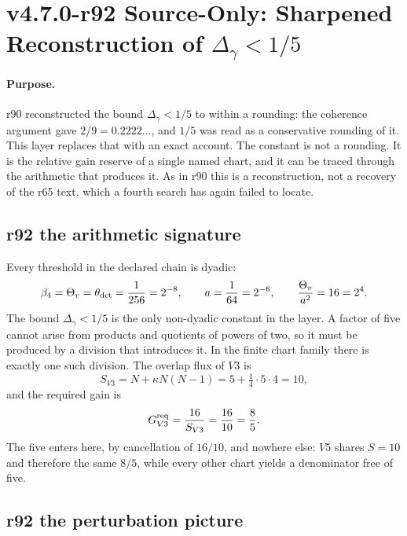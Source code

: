 \clearpage
\section*{v4.7.0-r92 Source-Only: Sharpened Reconstruction of \texorpdfstring{\(\Delta_\gamma<1/5\)}{Delta gamma < 1/5}}
\label{sec:r92-delta-gamma-sharpened}

\paragraph{Purpose.}
r90 reconstructed the bound \(\Delta_\gamma<1/5\) to within a rounding: the coherence
argument gave \(2/9=0.2222\ldots\), and \(1/5\) was read as a conservative rounding of it.
This layer replaces that with an exact account.  The constant is not a rounding.  It is the
relative gain reserve of a single named chart, and it can be traced through the arithmetic
that produces it.  As in r90 this is a reconstruction, not a recovery of the r65 text, which
a fourth search has again failed to locate.

\subsection*{r92 the arithmetic signature}
\label{subsec:r92-arithmetic-signature}

Every threshold in the declared chain is dyadic:
\[
\beta_4=\Theta_v=\theta_{\rm det}=\frac1{256}=2^{-8},
\qquad
a=\frac1{64}=2^{-6},
\qquad
\frac{\Theta_v}{a^2}=16=2^4 .
\]
The bound \(\Delta_\gamma<1/5\) is the only non-dyadic constant in the layer.  A factor of
five cannot arise from products and quotients of powers of two, so it must be produced by a
division that introduces it.  In the finite chart family there is exactly one such division.
The overlap flux of \(V3\) is
\[
S_{V3}=N+\kappa N(N-1)=5+\tfrac14\cdot5\cdot4=10,
\]
and the required gain is
\[
G_{V3}^{\rm req}=\frac{16}{S_{V3}}=\frac{16}{10}=\frac85 .
\]
The five enters here, by cancellation of \(16/10\), and nowhere else: \(V5\) shares
\(S=10\) and therefore the same \(8/5\), while every other chart yields a denominator free of
five.

\subsection*{r92 the perturbation picture}
\label{subsec:r92-perturbation-picture}

